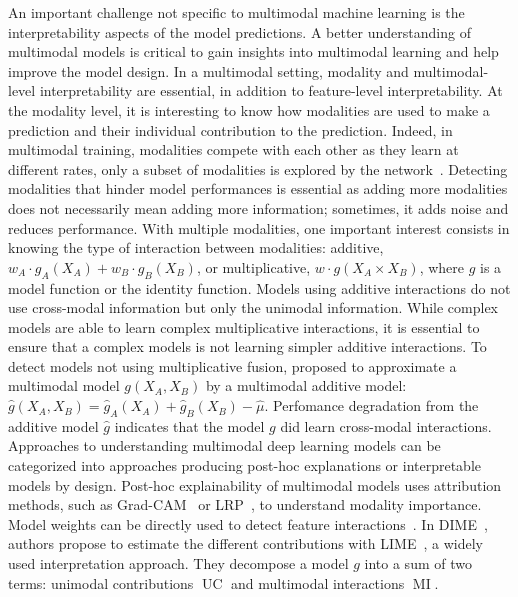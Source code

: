\documentclass[../main.tex]{subfiles}
\begin{document}
	An important challenge not specific to multimodal machine learning is the interpretability aspects of the model predictions.
	A better understanding of multimodal models is critical to gain insights into multimodal learning and help improve the model design.
	In a multimodal setting, modality and multimodal-level interpretability are essential, in addition to feature-level interpretability.
	At the modality level, it is interesting to know how modalities are used to make a prediction and their individual contribution to the prediction.
	Indeed, in multimodal training, modalities compete with each other as they learn at different rates, only a subset of modalities is explored by the network~\cite{pmlr-v162-huang22e}.
	Detecting modalities that hinder model performances is essential as adding more modalities does not necessarily mean adding more information; sometimes, it adds noise and reduces performance.
	With multiple modalities, one important interest consists in knowing the type of interaction between modalities: additive, \( w_A\cdot g_A\left(X_A\right) + w_B\cdot g_B\left(X_B\right)\),  or multiplicative, \(w\cdot  g\left( X_A \times X_B\right)\), where \(g\) is a model function or the identity function.
	Models using additive interactions do not use cross-modal information but only the unimodal information.
	While complex models are able to learn complex multiplicative interactions, it is essential to ensure that a complex models is not learning simpler additive interactions.
	To detect models not using multiplicative fusion, \citeauthor{EMAP} proposed to approximate a multimodal model \(g\left(X_A,X_B\right)\) by a multimodal additive model: \(\hat{g}\left(X_A,X_B\right) = \hat{g}_A\left(X_A\right) + \hat{g}_B\left(X_B\right) - \hat{\mu}\).
	Perfomance degradation from the additive model \(\hat{g}\) indicates that the model \(g\) did learn cross-modal interactions.
	Approaches to understanding multimodal deep learning models can be categorized into approaches producing post-hoc explanations or interpretable models by design.
	Post-hoc explainability of multimodal models uses attribution methods, such as Grad-CAM~\cite{Chandrasekaran2018DoEM} or LRP~\cite{Ellis2021}, to understand modality importance.
	Model weights can be directly used to detect feature interactions~\cite{tsang2017detecting}.
	In DIME~\cite{DIME}, authors propose to estimate the different contributions with LIME~\cite{LIME}, a widely used interpretation approach.
	They decompose a model \(g\) into a sum of two terms: unimodal contributions \(\operatorname{UC}\) and multimodal interactions \(\operatorname{MI}\).
\end{document}
